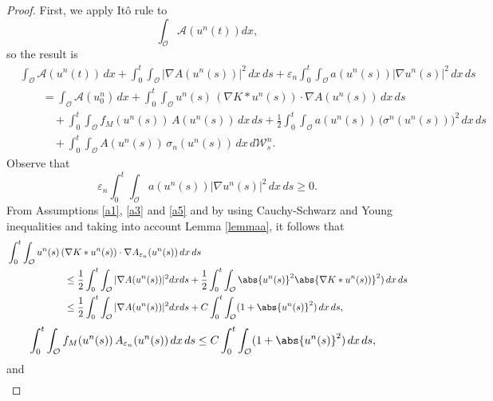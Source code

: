 \documentclass[10pt,number,preprint,times]{elsarticle}
\numberwithin{equation}{section} %
\begin{document}
\begin{proof}
{
First, we apply It\^o rule to
$$
\int_{\mathcal{O}}\mathcal{A}(u^n(t))dx,
$$
so the result is 
\begin{equation}\label{firstpart}
\begin{split}
&\int_{\mathcal{O}}\mathcal{A}(u^n(t))\,dx
+ \int_0^t\int_{\mathcal{O}} |\nabla A(u^n(s))|^2 \,dx\,ds+\varepsilon_n  \int_0^t\int_{\mathcal{O}} a(u^n(s))|\nabla u^n(s)|^2 \,dx\,ds\\
&\qquad = \int_{\mathcal{O}}\mathcal{A}(u^n_0)\,dx
+ \int_0^t\int_{\mathcal{O}} u^n(s)\,(\nabla K\ast u^n(s))\cdot \nabla A(u^n(s))\,dx\,ds\\
&\qquad\quad + \int_0^t\int_{\mathcal{O}} f_M(u^n(s))\,A(u^n(s))\,dx\,ds
+ \frac{1}{2}\int_0^t\int_{\mathcal{O}} a(u^n(s))\,\big(\sigma^n(u^n(s))\big)^2 \,dx\,ds\\
&\qquad\quad + \int_0^t\int_{\mathcal{O}} A(u^n(s))\,\sigma_n(u^n(s)) \,dx\,d\mathcal{W}^n_s.
\end{split}
\end{equation}
Observe that 
$$
\varepsilon_n  \int_0^t\int_{\mathcal{O}} a(u^n(s))|\nabla u^n(s)|^2 \,dx\,ds\geq 0.
$$
From Assumptions \ref{a1}, \ref{a3} and \ref{a5} and by using Cauchy-Schwarz and Young inequalities and taking into account Lemma \ref{lemmaa}, it follows that
\begin{equation}\label{young1}
\begin{split}
& \int_0^t\int_{\mathcal{O}} u^n(s)\,(\nabla K\ast u^n(s))\cdot \nabla A_{\varepsilon_n}(u^n(s))\,dx\,ds\\
&\qquad \qquad \qquad \leq
 \dfrac{1}{2}\int_0^t \int_{\mathcal{O}} \vert \nabla A(u^n(s)) \vert^2 dx ds
+\frac{1}{2} \int_0^t\int_{\mathcal{O}} \abs{u^n(s)}^2\abs{\nabla K\ast u^n(s))}^2)\,dx\,ds\\
&\qquad \qquad \qquad \leq
 \dfrac{1}{2}\int_0^t \int_{\mathcal{O}} \vert \nabla A(u^n(s)) \vert^2 dx ds
+C\int_0^t\int_{\mathcal{O}} (1+\abs{u^n(s)}^2)\,dx\,ds,
	\end{split}
\end{equation}
\begin{equation}\label{young2}
\begin{split}
& \int_0^t\int_{\mathcal{O}} f_M(u^n(s))\,A_{\varepsilon_n}(u^n(s))\,dx\,ds \leq 
C\int_0^t\int_{\mathcal{O}} (1+\abs{u^n(s)}^2)\,dx\,ds,
	\end{split}
\end{equation}
and 
\begin{equation}\label{young3}
\begin{split}

\end{split}
\end{equation}}
\end{proof}
\end{document}
